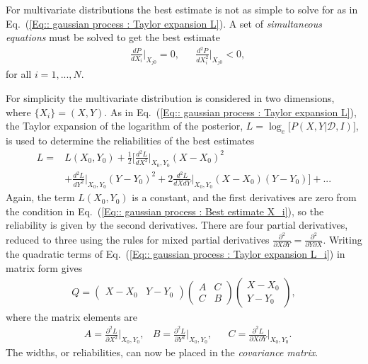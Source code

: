 \documentclass[twoside,english]{uiofysmaster}
\begin{document}
{{For multivariate distributions the best estimate is not as simple to solve for as in Eq.~(\ref{Eq:: gaussian process : Taylor expansion L}). A set of \textit{simultaneous equations} must be solved to get the best estimate
\begin{align}\label{Eq:: gaussian process : Best estimate X_i}
&\frac{dP}{dX_i} \Big|_{X_{j0}} =0, &&\frac{d^2P}{dX_i^2} \Big|_{X_{j0}} < 0,
\end{align}
for all $i=1,...,N$.

For simplicity the multivariate distribution is considered in two dimensions, where $\{ X_i \}=(X, Y)$. As in Eq.~(\ref{Eq:: gaussian process : Taylor expansion L}), the Taylor expansion of the logarithm of the posterior, $L = \log_e \Big[ P(X, Y |\mathcal{D}, I) \Big]$, is used to determine the reliabilities of the best estimates
\begin{align}\label{Eq:: gaussian process : Taylor expansion L_i}
L =& L(X_0, Y_0) + \frac{1}{2} \Big[ \frac{d^2L}{dX^2}  \Big|_{X_0, Y_0}(X-X_0)^2 \nonumber \\
& + \frac{d^2L}{dY^2}  \Big|_{X_0, Y_0}(Y-Y_0)^2 + 2 \frac{d^2L}{dXdY}  \Big|_{X_0, Y_0}(X-X_0)(Y-Y_0) \Big] +...
\end{align}
Again, the term $L(X_0, Y_0)$ is a constant, and the first derivatives are zero from the condition in Eq.~(\ref{Eq:: gaussian process : Best estimate X_i}), so the reliability is given by the second derivatives. There are four partial derivatives, reduced to three using the rules for mixed partial derivatives $\frac{\partial^2}{\partial X \partial Y} = \frac{\partial^2}{\partial Y \partial X}$. Writing the quadratic terms of Eq.~(\ref{Eq:: gaussian process : Taylor expansion L_i}) in matrix form gives
\begin{align}
Q = 
\begin{pmatrix}
X-X_0 & Y -Y_0
\end{pmatrix}
\begin{pmatrix}
A & C\\
C & B
\end{pmatrix}
\begin{pmatrix}
X -X_0\\
Y-Y_0
\end{pmatrix},
\end{align}
where the matrix elements are 
\begin{align}\label{Eq:: gaussian process : covariance matrix ABC}
&A = \frac{\partial^2 L}{\partial X^2} \Big|_{X_0, Y_0}, &B = \frac{\partial^2 L}{\partial Y^2} \Big|_{X_0, Y_0}, &&C = \frac{\partial^2 L}{\partial X \partial Y} \Big|_{X_0, Y_0}.
\end{align}
The widths, or reliabilities, can now be placed in the \textit{covariance matrix}.


}}
\end{document}
